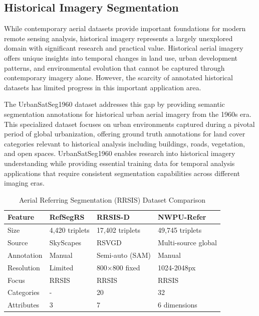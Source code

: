 \subsection{Historical Imagery Segmentation}

While contemporary aerial datasets provide important foundations for modern remote sensing analysis, historical imagery represents a largely unexplored domain with significant research and practical value. Historical aerial imagery offers unique insights into temporal changes in land use, urban development patterns, and environmental evolution that cannot be captured through contemporary imagery alone. However, the scarcity of annotated historical datasets has limited progress in this important application area.

The UrbanSatSeg1960 dataset addresses this gap by providing semantic segmentation annotations for historical urban aerial imagery from the 1960s era. This specialized dataset focuses on urban environments captured during a pivotal period of global urbanization, offering ground truth annotations for land cover categories relevant to historical analysis including buildings, roads, vegetation, and open spaces. UrbanSatSeg1960 enables research into historical imagery understanding while providing essential training data for temporal analysis applications that require consistent segmentation capabilities across different imaging eras.

\begin{table}[htbp]
\centering
\caption{Aerial Referring Segmentation (RRSIS) Dataset Comparison}
\label{tab:rrsis_comparison}
\begin{tabular}{@{}llll@{}}
\toprule
\textbf{Feature} & \textbf{RefSegRS} & \textbf{RRSIS-D} & \textbf{NWPU-Refer} \\
\midrule
Size & 4,420 triplets & 17,402 triplets & 49,745 triplets \\
Source & SkyScapes & RSVGD & Multi-source global \\
Annotation & Manual & Semi-auto (SAM) & Manual \\
Resolution & Limited & 800×800 fixed & 1024-2048px \\
Focus & RRSIS & RRSIS & RRSIS \\
Categories & - & 20 & 32 \\
Attributes & 3 & 7 & 6 dimensions \\
\bottomrule
\end{tabular}
\end{table}


